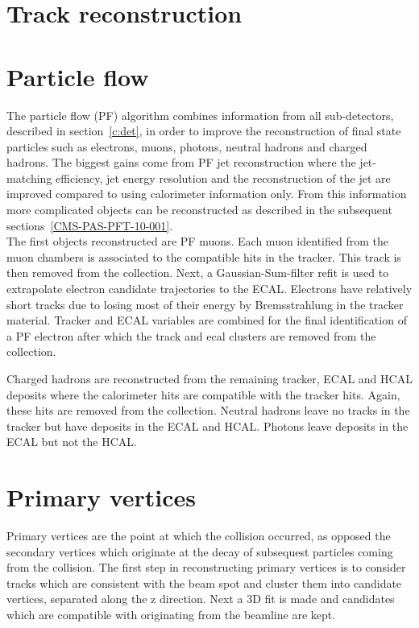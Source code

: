 
\section{Track reconstruction}

\section{Particle flow ~\label{sec:PF}}

The particle flow (PF) algorithm combines information from all sub-detectors, described in section~\ref{c:det}, in order to improve the reconstruction of final state particles such as electrons, muons, photons, neutral hadrons and charged hadrons. The biggest gains come from PF jet reconstruction where the jet-matching efficiency, jet energy resolution and the reconstruction of the jet \pt are improved compared to using calorimeter information only. From this information more complicated objects can be reconstructed as described in the subsequent sections~\ref{CMS-PAS-PFT-10-001}.\\

The first objects reconstructed are PF muons. Each muon identified from the muon chambers is associated to the compatible hits in the tracker. This track is then removed from the collection. Next, a Gaussian-Sum-filter refit is used to extrapolate electron candidate trajectories to the ECAL. Electrons have relatively short tracks due to losing most of their energy by Bremsstrahlung in the tracker material. Tracker and ECAL variables are combined for the final identification of a PF electron after which the track and ecal clusters are removed from the collection.

Charged hadrons are reconstructed from the remaining tracker, ECAL and HCAL deposits where the calorimeter hits are compatible with the tracker hits. Again, these hits are removed from the collection. Neutral hadrons leave no tracks in the tracker but have deposits in the ECAL and HCAL. Photons leave deposits in the ECAL but not the HCAL.

\section{Primary vertices \label{sec:PVreco}}

Primary vertices are the point at which the collision occurred, as opposed the secondary vertices which originate at the decay of subsequest particles coming from the collision. The first step in reconstructing primary vertices is to consider tracks which are consistent with the beam spot and cluster them into candidate vertices, separated along the z direction. Next a 3D fit is made and candidates which are compatible with originating from the beamline are kept.

